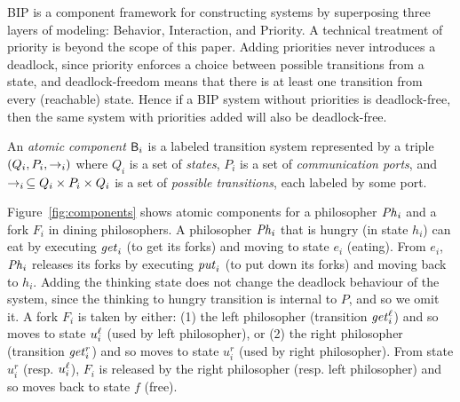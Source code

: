 
BIP is a component framework for constructing systems by superposing three layers of modeling: Behavior, Interaction,
and Priority.
%
A technical treatment of priority is beyond the scope of this paper. Adding priorities never introduces a deadlock,
since priority enforces a choice between possible transitions from a state, and deadlock-freedom means that there is at
least one transition from every (reachable) state.  Hence if a BIP system without priorities is deadlock-free, then the
same system with priorities added will also be deadlock-free.

\begin{definition}
An  {\em atomic component} $\mathsf{B}_i$ is a labeled transition system represented by a triple
$(Q_i, P_i, \stackrel{}{\rightarrow}_i)$ where $Q_i$ is a set of {\em states}, $P_i$ is a set of {\em communication ports}, and
$\stackrel{}{\rightarrow}_i\, \subseteq Q_i \times P_i \times Q_i$ is a set of {\em possible transitions}, each labeled by some port.
\end{definition}


Figure~\ref{fig:components} shows atomic components for a philosopher $\mathit{Ph}_i$ and a fork $F_i$ in dining philosophers.
%
A philosopher $\mathit{Ph}_i$ that is hungry (in state $h_i$) can eat by executing $\mathit{get}_i$ (to get its forks) and moving to state $e_i$ (eating). From $e_i$,
$\mathit{Ph}_i$ releases its forks by executing $\mathit{put}_i$ (to put down its forks) and moving back to $h_i$.
%
Adding the thinking state does not change the deadlock behaviour of the system, since the thinking to hungry transition is internal to $P$, and so we
omit it.
%
A fork $F_i$ is taken by either: (1) the left philosopher (transition $\mathit{get}_i^\ell$) and so moves to state $u_i^\ell$ (used by left philosopher), or (2) the
right philosopher (transition $\mathit{get}_i^r$) and so moves to state $u_i^r$ (used by right philosopher). From state $u_i^r$ (resp. $u_i^\ell$), $F_i$ is released by
the right philosopher (resp. left philosopher) and so moves back to state $f$ (free).
%


